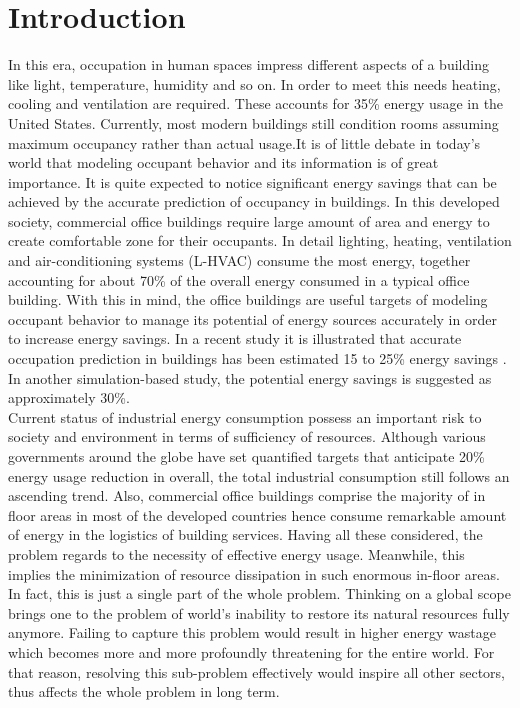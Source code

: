 \documentclass[conference]{IEEEtran}
\begin{document}
\section{Introduction}
In this era, occupation in human spaces impress different aspects of a building like light, temperature, humidity and so on. In order to meet this needs heating, cooling and ventilation are required. These accounts for 35\% energy usage in the United States. Currently, most modern
buildings still condition rooms assuming maximum occupancy rather than actual usage.It is of little debate in today’s world that modeling occupant behavior and its information is of great importance. It is quite expected to notice significant energy savings that can be achieved by the accurate prediction of occupancy in buildings. In this developed society, commercial office buildings require large amount of area and energy to create comfortable zone for their occupants. In detail lighting, heating, ventilation and
air-conditioning systems (L-HVAC) consume the most energy,
together accounting for about 70\% of the overall energy consumed in
a typical office building\cite{OccMeasure}. With this in mind, the office buildings are useful targets of modeling occupant behavior to manage its potential of energy sources accurately in order to increase energy savings. In a recent study it is illustrated that accurate occupation prediction in buildings has been estimated 15 to 25\% energy savings \cite{ReductoHVAC}. In another simulation-based study\cite{SensorOcc}, the potential energy savings is suggested as approximately 30\%.\\

Current status of industrial energy consumption possess an important risk to society and environment in terms of sufficiency of resources. Although various governments around the globe have set quantified targets that anticipate 20\%\cite{TargetCons} energy usage reduction in overall, the total industrial consumption still follows an ascending trend. Also, commercial office buildings comprise the majority of in floor areas in most of the developed countries hence consume remarkable amount of energy in the logistics of building services. Having all these considered, the problem regards to the necessity of effective energy usage. Meanwhile, this implies the minimization of resource dissipation in such enormous in-floor areas. In fact, this is just a single part of the whole problem. Thinking on a global scope brings one to the problem of world's inability to restore its natural resources fully anymore. Failing to capture this problem would result in higher energy wastage which becomes more and more profoundly threatening for the entire world. For that reason, resolving this sub-problem effectively would inspire all other sectors, thus affects the whole problem in long term.
\end{document}

